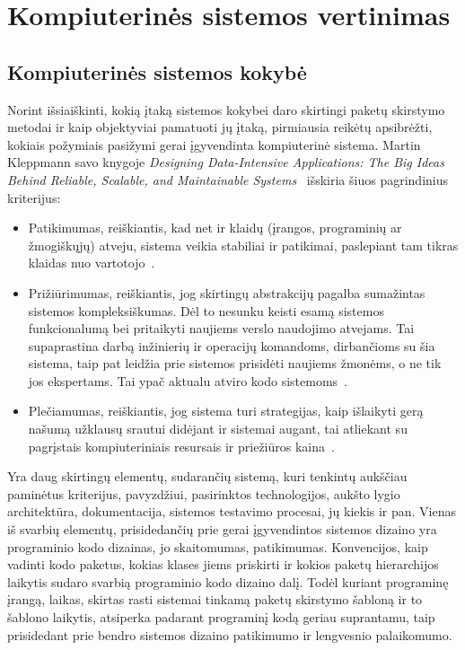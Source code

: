 \section{Kompiuterinės sistemos vertinimas}
\subsection{Kompiuterinės sistemos kokybė}
Norint išsiaiškinti, kokią įtaką sistemos kokybei daro skirtingi paketų skirstymo metodai ir kaip objektyviai pamatuoti jų įtaką, pirmiausia
reikėtų apsibrėžti, kokiais požymiais pasižymi gerai įgyvendinta kompiuterinė sistema.
Martin Kleppmann savo knygoje \textit{Designing Data-Intensive Applications: The Big Ideas Behind Reliable, Scalable, and Maintainable Systems}~\cite{DataIntensiveApplications} išskiria šiuos pagrindinius kriterijus:
\begin{itemize}
    \item Patikimumas, reiškiantis, kad net ir klaidų (įrangos, programinių ar žmogiškųjų) atveju,
    sistema veikia stabiliai ir patikimai, paslepiant tam tikras klaidas nuo vartotojo~\cite{DataIntensiveApplications}.
    \item Prižiūrimumas, reiškiantis, jog skirtingų abstrakcijų pagalba sumažintas sistemos kompleksiškumas.
    Dėl to nesunku keisti esamą sistemos funkcionalumą bei pritaikyti naujiems verslo naudojimo atvejams.
    Tai supaprastina darbą inžinierių ir operacijų komandoms, dirbančioms su šia sistema, taip pat leidžia prie sistemos prisidėti naujiems žmonėms, o ne
    tik jos ekspertams.
    Tai ypač aktualu atviro kodo sistemoms~\cite{DataIntensiveApplications}.
    \item Plečiamumas, reiškiantis, jog sistema turi strategijas, kaip išlaikyti gerą našumą užklausų
    srautui didėjant ir sistemai augant, tai atliekant su pagrįstais kompiuteriniais resursais ir
    priežiūros kaina~\cite{DataIntensiveApplications}.
\end{itemize}
Yra daug skirtingų elementų, sudarančių sistemą, kuri tenkintų aukščiau paminėtus kriterijus,
pavyzdžiui, pasirinktos technologijos, aukšto lygio architektūra, dokumentacija, sistemos testavimo
procesai, jų kiekis ir pan.
Vienas iš svarbių elementų, prisidedančių prie gerai įgyvendintos sistemos dizaino yra programinio kodo dizainas, jo skaitomumas, patikimumas.
Konvencijos, kaip vadinti kodo paketus, kokias klases jiems priskirti ir kokios paketų hierarchijos laikytis sudaro svarbią programinio kodo dizaino dalį.
Todėl kuriant programinę įrangą, laikas, skirtas rasti sistemai tinkamą paketų skirstymo šabloną ir to šablono laikytis, atsiperka padarant
programinį kodą geriau suprantamu, taip prisidedant prie bendro sistemos dizaino patikimumo ir lengvesnio palaikomumo.

